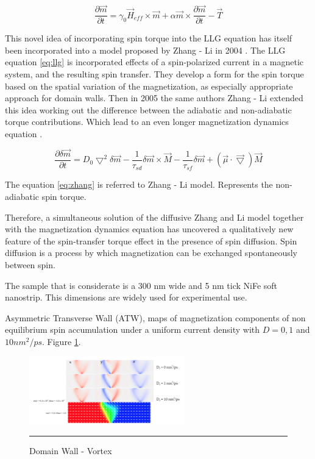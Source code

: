 \begin{equation}  \label{eq:llg}
	\frac{\partial \vec{m}}{\partial t} = \gamma_0\vec{H}_{eff} \times \vec{m} + \alpha \vec{m} \times \frac{\partial \vec{m}}{\partial t} - \vec{T}
\end{equation}

This novel idea of incorporating spin torque into the LLG equation has itself been incorporated into a model proposed by Zhang - Li in 2004 \cite{zhang2004}. The LLG equation \ref{eq:llg} is incorporated effects of a spin-polarized current in a magnetic system, and the resulting spin transfer. They develop a form for the spin torque based on the spatial variation of the magnetization, as especially appropriate approach for domain walls. Then in 2005 the same authors Zhang - Li extended this idea  working out the difference between the adiabatic and non-adiabatic torque contributions. Which lead to an even longer magnetization dynamics equation\cite{zhang} \cite{spindomain}.

\begin{equation} \label{eq:zhang}
 \frac{\partial \delta \vec{m} }{\partial t} =  D_{0}\bigtriangledown^{2} \delta \vec{m} - \frac{1}{\tau_{sd}} \delta \vec{m} \times \vec{M} - \frac{1}{\tau_{sf}}\delta \vec{m} +(\vec{\mu} \cdot\vec{\bigtriangledown} )\vec{M}
\end{equation}

The equation \ref{eq:zhang} is referred to Zhang - Li model. Represents the non-adiabatic spin torque.

Therefore, a simultaneous solution of the diffusive Zhang and Li model together with the magnetization dynamics equation has uncovered a qualitatively new feature of the spin-transfer torque effect in the presence of spin diffusion. Spin diffusion is a process by which magnetization can be exchanged spontaneously between spin.

The sample that is considerate is a 300 nm wide and 5 nm tick NiFe soft nanostrip. This dimensions are widely used for experimental use.

Asymmetric Transverse Wall (ATW), maps of magnetization components of non equilibrium spin accumulation under a uniform current density with $D = 0, 1$ and $10 nm^2 / ps$. Figure \ref{fig:atw}.

\begin{figure}[htbp]
	\centering
		\includegraphics[width=0.6\textwidth]{Figures/ATW.png}
		\rule{35em}{0.5pt}
	\caption[Domain Wall - Vortex]{Domain Wall - Vortex}
	\label{fig:atw}
\end{figure}

